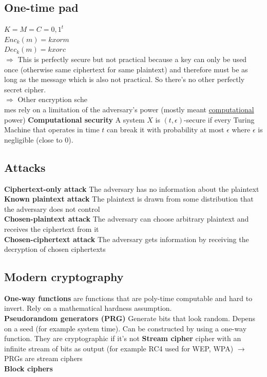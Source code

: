 \documentclass[12pt]{article}
\begin{document}
	\subsection{One-time pad}
	$K = M = C = {0,1}^t$\\
	$Enc_k(m) = k xor m$\\
	$Dec_k(m) = k xor c$\\
	$\Rightarrow$ This is perfectly secure but not practical because a key can only be used once (otherwise same ciphertext for same plaintext) and therefore must be as long as the message which is also not practical. So there's no other perfectly secret cipher.\\
	$\Rightarrow$ Other encryption sche\\mes rely on a limitation of the adversary's power (mostly meant \underline{computational} power)
	\textbf{Computational security} A system $X$ is $(t,\epsilon)$-secure if every Turing Machine that operates in time $t$ can break it with probability at most $\epsilon$ where $\epsilon$ is negligible (close to 0).
	
	\subsection{Attacks}
	\textbf{Ciphertext-only attack} The adversary has no information about the plaintext\\
	\textbf{Known plaintext attack} The plaintext is drawn from some distribution that the adversary does not control\\
	\textbf{Chosen-plaintext attack} The adversary can choose arbitrary plaintext and receives the ciphertext from it\\
	\textbf{Chosen-ciphertext attack} The adversary gets information by receiving the decryption of chosen ciphertexts
	
	\subsection{Modern cryptography}
	\textbf{One-way functions} are functions that are poly-time computable and hard to invert. Rely on a mathematical hardness assumption.\\
	\textbf{Pseudorandom generators (PRG)} Generate bits that look random. Depens on a seed (for example system time). Can be constructed by using a one-way function. They are cryptographic if it's not %
	\textbf{Stream cipher} cipher with an infinite stream of bits as output (for example RC4 used for WEP, WPA) $\rightarrow$ PRGs are stream ciphers\\
	\textbf{Block ciphers} %
	

	
	
\end{document}
